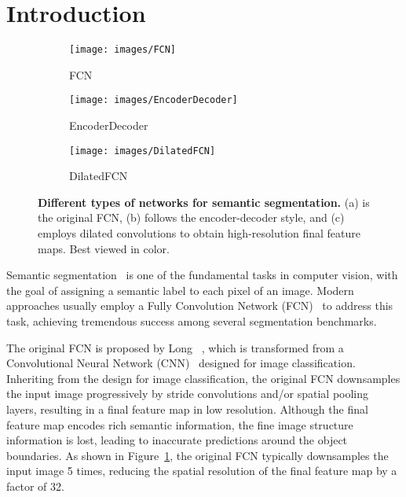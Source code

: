 \documentclass[10pt,twocolumn,letterpaper]{article}
\begin{document}
\section{Introduction}
\begin{figure*} 
\begin{center}
	\begin{subfigure}[b]{0.33\linewidth}
		\texttt{[image: images/FCN]}
      	\caption{FCN~\cite{long2015fully}}
      	\label{fig:fcns:fcn}
    \end{subfigure}
    \hfill
	\begin{subfigure}[b]{0.33\linewidth}
		\texttt{[image: images/EncoderDecoder]}
      	\caption{EncoderDecoder}
      	\label{fig:fcns:encoder_decoder}
    \end{subfigure}
    \hfill
	\begin{subfigure}[b]{0.33\linewidth}
		\texttt{[image: images/DilatedFCN]}
      	\caption{DilatedFCN}
      	\label{fig:fcns:dilated_fcn}
    \end{subfigure}
\end{center}
	\caption{\textbf{Different types of networks for semantic segmentation.} (a) is the original FCN, (b) follows the encoder-decoder style, and (c) employs dilated convolutions to obtain high-resolution final feature maps. Best viewed in color.}
	\label{fig:fcns}
\end{figure*}
Semantic segmentation~\cite{mottaghi2014role,zhou2017scene,caesar2018coco} is one of the fundamental tasks in computer vision, with the goal of assigning a semantic label to each pixel of an image.
Modern approaches usually employ a Fully Convolution Network (FCN)~\cite{long2015fully} to address this task, achieving tremendous success among several segmentation benchmarks.

The original FCN is proposed by Long \etal~\cite{long2015fully}, which is transformed from a Convolutional Neural Network (CNN)~\cite{lecun1998gradient,krizhevsky2012imagenet} designed for image classification.
Inheriting from the design for image classification, the original FCN downsamples the input image progressively by stride convolutions and/or spatial pooling layers, resulting in a final feature map in low resolution.
Although the final feature map encodes rich semantic information, the fine image structure information is lost, leading to inaccurate predictions around the object boundaries.
As shown in Figure~\ref{fig:fcns:fcn}, the original FCN typically downsamples the input image 5 times, reducing the spatial resolution of the final feature map by a factor of 32.
\end{document}
